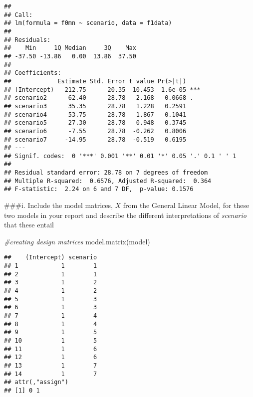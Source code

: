 \documentclass[
]{article}
\newenvironment{Shaded}{\begin{snugshade}}{\end{snugshade}}
\newcommand{\AttributeTok}[1]{\textcolor[rgb]{0.77,0.63,0.00}{#1}}
\newcommand{\CommentTok}[1]{\textcolor[rgb]{0.56,0.35,0.01}{\textit{#1}}}
\newcommand{\FunctionTok}[1]{\textcolor[rgb]{0.00,0.00,0.00}{#1}}
\newcommand{\NormalTok}[1]{#1}
\newcommand{\OtherTok}[1]{\textcolor[rgb]{0.56,0.35,0.01}{#1}}
\newcommand{\SpecialCharTok}[1]{\textcolor[rgb]{0.00,0.00,0.00}{#1}}
\begin{document}
\begin{Shaded}
\end{Shaded}

\begin{verbatim}
## 
## Call:
## lm(formula = f0mn ~ scenario, data = f1data)
## 
## Residuals:
##    Min     1Q Median     3Q    Max 
## -37.50 -13.86   0.00  13.86  37.50 
## 
## Coefficients:
##             Estimate Std. Error t value Pr(>|t|)    
## (Intercept)   212.75      20.35  10.453  1.6e-05 ***
## scenario2      62.40      28.78   2.168   0.0668 .  
## scenario3      35.35      28.78   1.228   0.2591    
## scenario4      53.75      28.78   1.867   0.1041    
## scenario5      27.30      28.78   0.948   0.3745    
## scenario6      -7.55      28.78  -0.262   0.8006    
## scenario7     -14.95      28.78  -0.519   0.6195    
## ---
## Signif. codes:  0 '***' 0.001 '**' 0.01 '*' 0.05 '.' 0.1 ' ' 1
## 
## Residual standard error: 28.78 on 7 degrees of freedom
## Multiple R-squared:  0.6576, Adjusted R-squared:  0.364 
## F-statistic:  2.24 on 6 and 7 DF,  p-value: 0.1576
\end{verbatim}

\#\#\#i. Include the model matrices, \(X\) from the General Linear
Model, for these two models in your report and describe the different
interpretations of \emph{scenario} that these entail

\begin{Shaded}
\begin{Highlighting}[]
\CommentTok{\#creating design matrices }
\FunctionTok{model.matrix}\NormalTok{(model)}
\end{Highlighting}
\end{Shaded}

\begin{verbatim}
##    (Intercept) scenario
## 1            1        1
## 2            1        1
## 3            1        2
## 4            1        2
## 5            1        3
## 6            1        3
## 7            1        4
## 8            1        4
## 9            1        5
## 10           1        5
## 11           1        6
## 12           1        6
## 13           1        7
## 14           1        7
## attr(,"assign")
## [1] 0 1
\end{verbatim}
\end{document}
